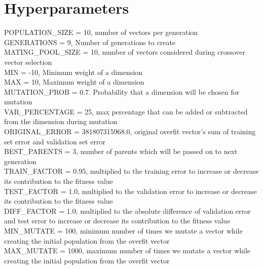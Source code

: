 \documentclass[10pt]{report}
\theoremstyle{definition}
\theoremstyle{plain}
\begin{document}
\section*{Hyperparameters}
POPULATION\_SIZE = 10, number of vectors per generation \vspace{0.1cm} \\ 
GENERATIONS = 9, Number of generations to create \vspace{0.1cm} \\
MATING\_POOL\_SIZE = 10, number of vectors considered during crossover vector selection \vspace{0.1cm} \\
MIN = -10, Minimum weight of a dimension \vspace{0.1cm} \\ 
MAX = 10, Maximum weight of a dimension \vspace{0.1cm} \\ 
MUTATION\_PROB = 0.7. Probability that a dimension will be chosen for mutation \vspace{0.1cm} \\
VAR\_PERCENTAGE = 25, max percentage that can be added or subtracted from the dimension during mutation \vspace{0.1cm} \\
ORIGINAL\_ERROR = 381807315968.0, original overfit vector's sum of training set error and validation set error \vspace{0.1cm} \\
BEST\_PARENTS = 3, number of parents which will be passed on to next generation \vspace{0.1cm} \\
TRAIN\_FACTOR = 0.95, multiplied to the training error to increase or decrease its contribution to the fitness value \vspace{0.1cm} \\
TEST\_FACTOR = 1.0, multiplied to the validation error to increase or decrease its contribution to the fitness value \vspace{0.1cm} \\
DIFF\_FACTOR = 1.0, multiplied to the absolute difference of validation error and test error to increase or decrease its contribution to the fitness value \vspace{0.1cm} \\
MIN\_MUTATE = 100, minimum number of times we mutate a vector while creating the initial population from the overfit vector \vspace{0.1cm} \\
MAX\_MUTATE = 1000, maximum number of times we mutate a vector while creating the initial population from the overfit vector \vspace{0.1cm} \\
\end{document}
